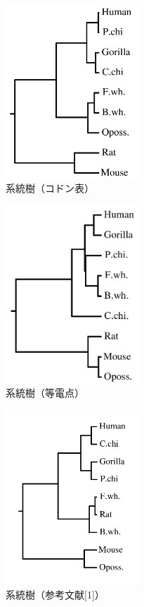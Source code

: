 \documentclass[a4paper,12pt]{jsreport}
\begin{document}
\begin{figure}[H]
\centering
\includegraphics[width=50mm]{picx4.png}
\caption{系統樹（コドン表）}
\end{figure}

\begin{figure}[H]
\centering
\includegraphics[width=50mm]{picx6.png}
\caption{系統樹（等電点）}
\end{figure}

\begin{figure}[H]
\centering
\includegraphics[width=50mm]{picx5.png}
\caption{系統樹（参考文献[1]）}
\end{figure}
\end{document}
